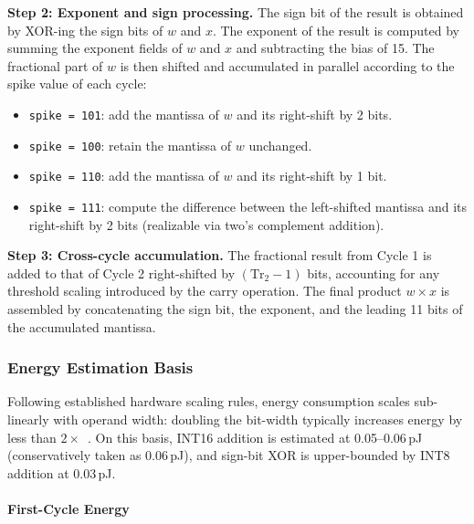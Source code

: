 \textbf{Step 2: Exponent and sign processing.}
The sign bit of the result is obtained by XOR-ing the sign bits of $w$ and $x$. The exponent of the result is computed by summing the exponent fields of $w$ and $x$ and subtracting the bias of 15. The fractional part of $w$ is then shifted and accumulated in parallel according to the spike value of each cycle:
\begin{itemize}
    \item \texttt{spike = 101}: add the mantissa of $w$ and its right-shift by 2 bits.
    \item \texttt{spike = 100}: retain the mantissa of $w$ unchanged.
    \item \texttt{spike = 110}: add the mantissa of $w$ and its right-shift by 1 bit.
    \item \texttt{spike = 111}: compute the difference between the left-shifted mantissa and its right-shift by 2 bits (realizable via two's complement addition).
\end{itemize}

\textbf{Step 3: Cross-cycle accumulation.}
The fractional result from Cycle 1 is added to that of Cycle 2 right-shifted by $(\mathrm{Tr}_2 - 1)$ bits, accounting for any threshold scaling introduced by the carry operation. The final product $w \times x$ is assembled by concatenating the sign bit, the exponent, and the leading 11 bits of the accumulated mantissa.

\subsubsection*{Energy Estimation Basis}

Following established hardware scaling rules, energy consumption scales sub-linearly with operand width: doubling the bit-width typically increases energy by less than $2\times$~\cite{energy_scale}. On this basis, INT16 addition is estimated at 0.05--0.06\,pJ (conservatively taken as 0.06\,pJ), and sign-bit XOR is upper-bounded by INT8 addition at 0.03\,pJ.

\paragraph{First-Cycle Energy}

